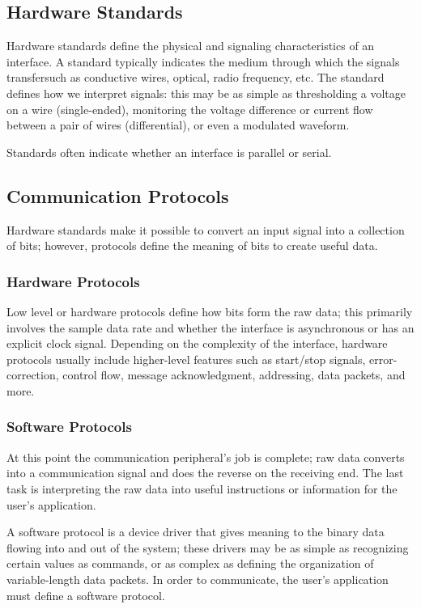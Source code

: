 \documentclass[openany,11pt,fleqn]{book} %
\begin{document}
\subsection{Hardware Standards}	
Hardware standards define the physical and signaling characteristics of an interface.
A standard typically indicates the medium through which the signals transfer\textemdash such as conductive wires, optical, radio frequency, etc. The standard defines how we interpret signals: this may be as simple as thresholding a voltage on a wire (single-ended), monitoring the voltage difference or current flow between a pair of wires (differential), or even a modulated waveform. 

Standards often indicate whether an interface is parallel or serial.

\subsection{Communication Protocols}
Hardware standards make it possible to convert an input signal into a collection of bits; however, protocols define the meaning of bits to create useful data. 

\subsubsection{Hardware Protocols}
Low level or hardware protocols define how bits form the raw data; this primarily involves the sample data rate and whether the interface is asynchronous or has an explicit clock signal.
Depending on the complexity of the interface, hardware protocols usually include higher-level features such as start/stop signals, error-correction, control flow, message acknowledgment, addressing, data packets, and more.

\subsubsection{Software Protocols}	
At this point the communication peripheral's job is complete; raw data converts into a communication signal and does the reverse on the receiving end. The last task is interpreting the raw data into useful instructions or information for the user's application.

A software protocol is a device driver that gives meaning to the binary data flowing into and out of the system; these drivers may be as simple as recognizing certain values as commands, or as complex as defining the organization of variable-length data packets.  In order to communicate, the user's application must define a software protocol. 
\end{document}
